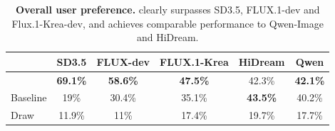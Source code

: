 \begin{table}
{\footnotesize
\setlength{\tabcolsep}{4.5pt}
  \centering
  \begin{tabular}{lccccc}
    \toprule
     & \textbf{SD3.5} &  \textbf{FLUX-dev} & \textbf{FLUX.1-Krea} & \textbf{HiDream} & \textbf{Qwen} \\    
    \midrule
    \modelname{} & \textbf{69.1\%} & \textbf{58.6\%} & \textbf{47.5\%} & 42.3\% & \textbf{42.1\%} \\
    Baseline & 19\% & 30.4\% & 35.1\% & \textbf{43.5\%} & 40.2\% \\
    Draw & 11.9\% & 11\% & 17.4\% & 19.7\% & 17.7\% \\
    \bottomrule
  \end{tabular}
  }
  \caption{\textbf{Overall user preference.} \modelname{} clearly surpasses SD3.5, FLUX.1-dev and Flux.1-Krea-dev, and achieves comparable performance to Qwen-Image and HiDream.}
  \label{tab:user-preference}
\end{table}